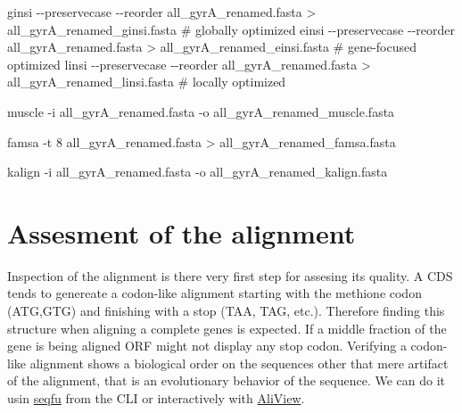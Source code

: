 \documentclass[
  letterpaper,
  DIV=11,
  numbers=noendperiod]{scrreprt}
\newenvironment{Shaded}{\begin{snugshade}}{\end{snugshade}}
\newcommand{\AttributeTok}[1]{\textcolor[rgb]{0.40,0.46,0.14}{#1}}
\newcommand{\CommentTok}[1]{\textcolor[rgb]{0.37,0.37,0.37}{#1}}
\newcommand{\ExtensionTok}[1]{\textcolor[rgb]{0.00,0.46,0.62}{#1}}
\newcommand{\NormalTok}[1]{\textcolor[rgb]{0.00,0.46,0.62}{#1}}
\newcommand{\OperatorTok}[1]{\textcolor[rgb]{0.37,0.37,0.37}{#1}}
\begin{document}
\begin{Shaded}
\begin{Highlighting}[]

\ExtensionTok{ginsi} \AttributeTok{{-}{-}preservecase} \AttributeTok{{-}{-}reorder}\NormalTok{ all\_gyrA\_renamed.fasta }\OperatorTok{\textgreater{}}\NormalTok{ all\_gyrA\_renamed\_ginsi.fasta }\CommentTok{\# globally optimized}
\ExtensionTok{einsi} \AttributeTok{{-}{-}preservecase} \AttributeTok{{-}{-}reorder}\NormalTok{ all\_gyrA\_renamed.fasta }\OperatorTok{\textgreater{}}\NormalTok{ all\_gyrA\_renamed\_einsi.fasta }\CommentTok{\# gene{-}focused optimized}
\ExtensionTok{linsi} \AttributeTok{{-}{-}preservecase} \AttributeTok{{-}{-}reorder}\NormalTok{ all\_gyrA\_renamed.fasta }\OperatorTok{\textgreater{}}\NormalTok{ all\_gyrA\_renamed\_linsi.fasta }\CommentTok{\# locally optimized}

\ExtensionTok{muscle} \AttributeTok{{-}i}\NormalTok{ all\_gyrA\_renamed.fasta }\AttributeTok{{-}o}\NormalTok{ all\_gyrA\_renamed\_muscle.fasta}

\ExtensionTok{famsa} \AttributeTok{{-}t}\NormalTok{ 8 all\_gyrA\_renamed.fasta }\OperatorTok{\textgreater{}}\NormalTok{ all\_gyrA\_renamed\_famsa.fasta}

\ExtensionTok{kalign} \AttributeTok{{-}i}\NormalTok{ all\_gyrA\_renamed.fasta }\AttributeTok{{-}o}\NormalTok{ all\_gyrA\_renamed\_kalign.fasta}
\end{Highlighting}
\end{Shaded}

\hypertarget{assesment-of-the-alignment}{%
\section*{Assesment of the alignment}\label{assesment-of-the-alignment}}

Inspection of the alignment is there very first step for assesing its
quality. A CDS tends to genereate a codon-like alignment starting with
the methione codon (ATG,GTG) and finishing with a stop (TAA, TAG, etc.).
Therefore finding this structure when aligning a complete genes is
expected. If a middle fraction of the gene is being aligned ORF might
not display any stop codon. Verifying a codon-like alignment shows a
biological order on the sequences other that mere artifact of the
alignment, that is an evolutionary behavior of the sequence. We can do
it usin \href{https://telatin.github.io/seqfu2/}{seqfu} from the CLI or
interactively with \href{https://github.com/AliView/AliView}{AliView}.
\end{document}
